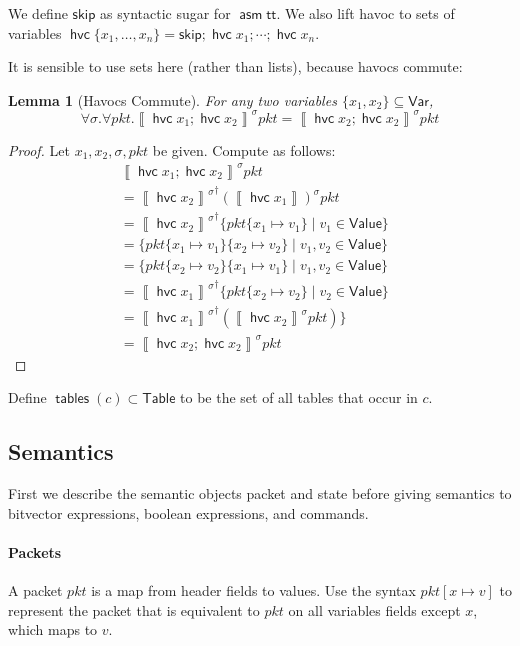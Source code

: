 \documentclass{article}
\newcommand{\pkt}{\mathit{pkt}}
\newcommand{\denote}[1]{\left\llbracket#1\right\rrbracket}
\newcommand{\TRUE}{\mathsf{tt}}
\newcommand{\Value}{\mathsf{Value}}
\newcommand{\Table}{\mathsf{Table}}
\newcommand{\Var}{\mathsf{Var}}
\newcommand{\assume}{\mathop{\mathsf{asm}}}
\newcommand{\havoc}[1]{\mathop{\mathsf{hvc}}#1}
\newcommand{\SKIP}{\mathsf{skip}}
\newcommand{\tables}{\mathop{\mathsf{tables}}}
\newtheorem{lemma}{Lemma}
\begin{document}
We define $\SKIP$ as syntactic sugar for $\assume \TRUE$. We also lift havoc to
sets of variables $\havoc \{x_1,\ldots,x_n\} = \SKIP; \havoc{x_1}; \cdots; \havoc{x_n}$.

It is sensible to use sets here (rather than lists), because havocs commute:

\begin{lemma}[Havocs Commute]
  For any two variables $\{x_1,x_2\} \subseteq \Var$,
  \[\forall \sigma.\forall \pkt. \denote{\havoc{x_1};\havoc{x_2}}^\sigma\pkt = \denote{\havoc{x_2};\havoc{x_2}}^\sigma\pkt \]
\end{lemma}

\begin{proof}
  Let $x_1, x_2,\sigma,\pkt$ be given.
  Compute as follows:
  \[
  \begin{array}{ll}
    \denote{\havoc{x_1};\havoc{x_2}}^\sigma\pkt\\
    = {\denote{\havoc{x_2}}^\sigma}^\dagger\left(\denote{\havoc{x_1}}\right)^\sigma\pkt
    & \\
    = {\denote{\havoc{x_2}}^\sigma}^\dagger\{\pkt\{x_1 \mapsto v_1\} \mid v_1 \in \Value\}
    & \\
    = \{\pkt\{x_1 \mapsto v_1\}\{x_2 \mapsto v_2\} \mid v_1,v_2 \in \Value\}
    & \\
    = \{\pkt\{x_2 \mapsto v_2\}\{x_1 \mapsto v_1\} \mid v_1,v_2 \in \Value\}
    & \\
    = {\denote{\havoc{x_1}}^\sigma}^\dagger\{\pkt\{x_2 \mapsto v_2\} \mid v_2 \in \Value\}
    & \\
    = {\denote{\havoc{x_1}}^\sigma}^\dagger\left(\denote{\havoc{x_2}}^\sigma\pkt\right)\}
    & \\
    = \denote{\havoc{x_2};\havoc{x_2}}^\sigma\pkt
  \end{array}
  \]
\end{proof}

Define $\tables(c) \subset \Table$ to be the set of all tables that occur in $c$.

\subsection{Semantics}

First we describe the semantic objects packet and state before giving semantics
to bitvector expressions, boolean expressions, and commands.

\paragraph{Packets}
A packet $\pkt$ is a map from header fields to values. Use the syntax $\pkt[x
  \mapsto v]$ to represent the packet that is equivalent to $\pkt$ on all variables
fields except $x$, which maps to $v$.
\end{document}
